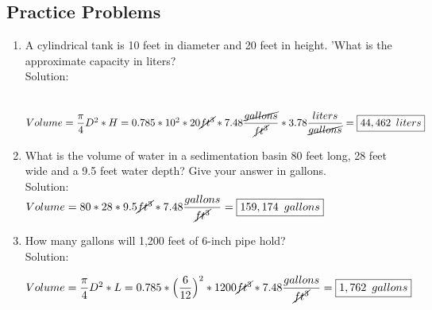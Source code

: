\documentclass{article}
\begin{document}
\subsection{Practice Problems} 
\begin{enumerate}

\item A cylindrical tank is 10 feet in diameter and 20 feet in height. 'What is the approximate capacity in liters?\\
Solution:\\

\\

$Volume=\dfrac{\pi}{4}D^2*H=0.785*10^2*20\cancel{ft^3}*7.48\dfrac{\cancel{gallons}}{\cancel{ft^3}}*3.78\dfrac{liters}{\cancel{gallons}}=\boxed{44,462 \enspace liters}$

\item What is the volume of water in a sedimentation basin 80 feet long, 28 feet wide and a 9.5 feet water depth? Give your answer in gallons.\\
Solution:\\
$Volume=80*28*9.5 \cancel{ft^3}*7.48\dfrac{gallons}{\cancel{ft^3}}=\boxed{159,174 \enspace gallons} $

\item How many gallons will 1,200 feet of 6-inch pipe hold?\\
Solution:\\
\begin{center}
\end{center}
$Volume=\dfrac{\pi}{4}D^2*L=0.785*\Big(\dfrac{6}{12}\Big)^2*1200\cancel{ft^3}*7.48\dfrac{gallons}{\cancel{ft^3}}=\boxed{1,762 \enspace gallons}$


\end{enumerate}
\end{document}
